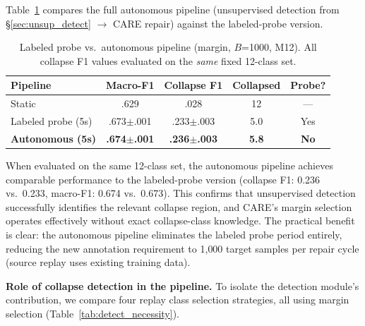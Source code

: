 \documentclass[journal]{IEEEtran}
\begin{document}
Table~\ref{tab:e2e} compares the full autonomous pipeline (unsupervised detection from \S\ref{sec:unsup_detect} $\to$ CARE repair) against the labeled-probe version.

\begin{table}[t]
\centering
\caption{Labeled probe vs.\ autonomous pipeline (margin, $B$=1000, M12). All collapse F1 values evaluated on the \textit{same} fixed 12-class set.}
\label{tab:e2e}
\small
\begin{tabular}{@{}l cccc@{}}
\toprule
Pipeline & Macro-F1 & Collapse F1 & Collapsed & Probe? \\
\midrule
Static & .629 & .028 & 12 & --- \\
Labeled probe (5s) & .673$\pm$.001 & .233$\pm$.003 & 5.0 & Yes \\
\textbf{Autonomous (5s)} & \textbf{.674$\pm$.001} & \textbf{.236$\pm$.003} & \textbf{5.8} & \textbf{No} \\
\bottomrule
\end{tabular}
\end{table}

When evaluated on the same 12-class set, the autonomous pipeline achieves comparable performance to the labeled-probe version (collapse F1: 0.236 vs.\ 0.233, macro-F1: 0.674 vs.\ 0.673).
This confirms that unsupervised detection successfully identifies the relevant collapse region, and CARE's margin selection operates effectively without exact collapse-class knowledge.
The practical benefit is clear: the autonomous pipeline eliminates the labeled probe period entirely, reducing the new annotation requirement to 1{,}000 target samples per repair cycle (source replay uses existing training data).

\textbf{Role of collapse detection in the pipeline.}
To isolate the detection module's contribution, we compare four replay class selection strategies, all using margin selection (Table~\ref{tab:detect_necessity}).
\end{document}
